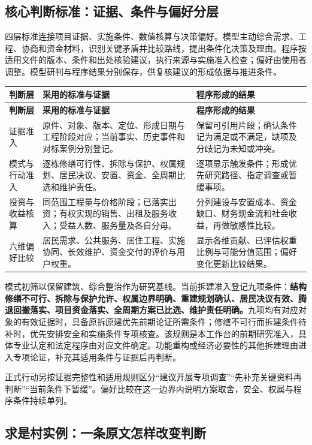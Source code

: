 \documentclass[UTF8,11pt,fontset=windows]{ctexart}
\begin{document}
\subsection{核心判断标准：证据、条件与偏好分层}

四层标准连接项目证据、实施条件、数值核算与决策偏好。模型主动综合需求、工程、协商和资金材料，识别关键矛盾并比较路线，提出条件化决策及理由。程序按适用文件的版本、条件和出处核验建议，执行来源与实施准入检查；偏好由使用者调整。模型研判与程序结果分别保存，供复核建议的形成依据与推进条件。

\begin{longtable}{@{}L{29mm}L{70mm}L{60mm}@{}}
\toprule\textbf{判断层}&\textbf{采用的标准与证据}&\textbf{程序形成的结果}\\\midrule
\endfirsthead
\toprule\textbf{判断层}&\textbf{采用的标准与证据}&\textbf{程序形成的结果}\\\midrule
\endhead
证据准入&原件、对象、版本、定位、形成日期与工程阶段对应；当前事实、历史事件和对标案例分别登记。&保留可引用片段；确认条件记为满足或不满足，缺项及分歧记为未知或冲突。\\
模式与行动准入&逐栋修缮可行性、拆除与保护、权属规划、居民决议、安置、资金、全周期比选和维护责任。&逐项显示触发条件；形成优先研究路径、指定调查或暂缓事项。\\
投资与收益核算&同范围工程量与价格阶段；已落实出资；有权实现的销售、出租及服务收入；受益人数、服务量及各自分母。&分列建设与安置成本、资金缺口、财务现金流和社会收益，再做敏感性比较。\\
六维偏好比较&居民需求、公共服务、居住工程、实施协同、长效维护、资金交付的评价与用户权重。&显示各维贡献、已评估权重比例与可能分值范围；偏好变化更新比较结果。\\
\bottomrule\end{longtable}

模式初筛以保留建筑、综合整治作为研究基线。当前拆建准入登记九项条件：\textbf{结构修缮不可行、拆除与保护允许、权属边界明确、重建规划确认、居民决议有效、腾退回搬落实、项目资金落实、全周期方案已比选、维护责任明确。}九项均有对应对象的有效证据时，具备原拆原建优先前期论证所需条件；修缮不可行而拆建条件待补时，优先安排安全和实施条件专项核查。该规则是本工作台的前期研究准入，具体专业认定和法定程序由对应文件确定。功能重构或经济必要性的其他拆建理由进入专项论证，补充其适用条件与证据后再判断。

正式行动另按证据完整性和适用规则区分“建议开展专项调查”“先补充关键资料再判断”“当前条件下暂缓”。偏好比较在这一边界内说明方案取舍，安全、权属与程序条件持续单列。

\subsection{求是村实例：一条原文怎样改变判断}
\end{document}
